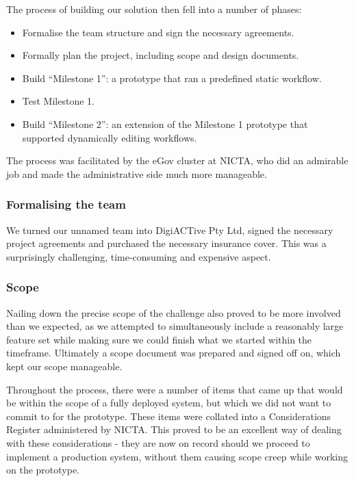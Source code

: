 \documentclass[12pt,a4paper,twosided]{article}
\begin{document}
The process of building our solution then fell into a
number of phases:

\begin{itemize}

\item
  Formalise the team structure and sign the necessary agreements.
\item
  Formally plan the project, including scope and design documents.
\item
  Build ``Milestone 1'': a prototype that ran a predefined static
  workflow.
\item
  Test Milestone 1.
\item
  Build ``Milestone 2'': an extension of the Milestone 1 prototype that
  supported dynamically editing workflows.
\end{itemize}

The process was facilitated by the eGov cluster at NICTA, who did an
admirable job and made the administrative side much more manageable.

\subsubsection{Formalising the team}

We turned our unnamed team into DigiACTive Pty Ltd, signed the
necessary project agreements and purchased the necessary insurance
cover. This was a surprisingly challenging, time-consuming and expensive
aspect.

\subsubsection{Scope}

Nailing down the precise scope of the challenge also proved to be more
involved than we expected, as we attempted to simultaneously include a
reasonably large feature set while making sure we could finish what we
started within the timeframe. Ultimately a scope document was prepared
and signed off on, which kept our scope manageable.

Throughout the process, there were a number of items that came up that
would be within the scope of a fully deployed system, but which we did
not want to commit to for the prototype. These items were collated into
a Considerations Register administered by NICTA. This proved to be an
excellent way of dealing with these considerations - they are now on
record should we proceed to implement a production system, without them
causing scope creep while working on the prototype.
\end{document}

